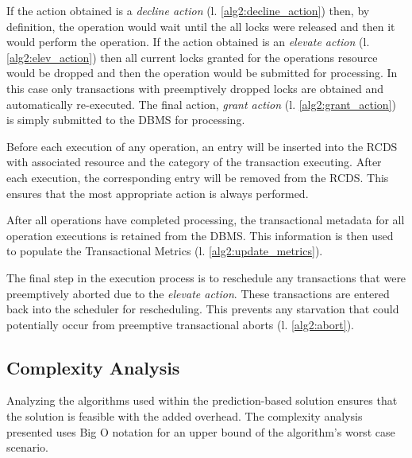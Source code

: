 \documentclass[conference]{IEEEtran}
\begin{document}
If the action obtained is a \textit{decline action} (l. \ref{alg2:decline_action}) then, by definition, the operation would wait until the all locks were released and then it would perform the operation. If the action obtained is an \textit{elevate action} (l. \ref{alg2:elev_action}) then all current locks granted for the operations resource would be dropped and then the operation would be submitted for processing. In this case only transactions with preemptively dropped locks are obtained and automatically re-executed. The final action, \textit{grant action} (l. \ref{alg2:grant_action}) is simply submitted to the DBMS for processing. 


Before each execution of any operation, an entry will be inserted into the RCDS with associated resource and the category of the transaction executing. After each execution, the corresponding entry will be removed from the RCDS. This ensures that the most appropriate action is always performed.

After all operations have completed processing, the transactional metadata for all operation executions is retained from the DBMS. This information is then used to populate the Transactional Metrics (l. \ref{alg2:update_metrics}). 


The final step in the execution process is to reschedule any transactions that were preemptively aborted due to the \textit{elevate action}. These transactions are entered back into the scheduler for rescheduling. This prevents any starvation that could potentially occur from preemptive transactional aborts (l. \ref{alg2:abort}).

\subsection{Complexity Analysis}
Analyzing the algorithms used within the prediction-based solution ensures that the solution is feasible with the added overhead. The complexity analysis presented uses Big O notation for an upper bound of the algorithm's worst case scenario.
\end{document}
